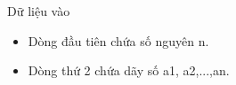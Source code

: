 Dữ liệu vào
\begin{itemize}
	\item     Dòng đầu tiên chứa số nguyên n.   
	\item     Dòng thứ 2 chứa dãy số a1, a2,...,an.   
\end{itemize}